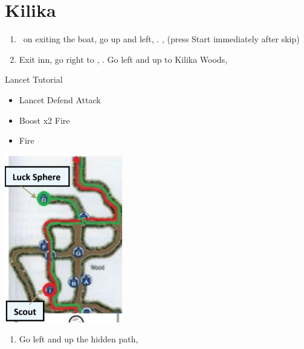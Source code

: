 \chapter{Kilika}

\begin{enumerate}
    \item \sd\ on exiting the boat, go up and left, \sd. \skippablefmv[2:00], (press Start immediately after skip) \sd
    \item Exit inn, go right to \wakka, \sd. Go left and up to Kilika Woods, \sd
\end{enumerate}
\begin{battle}{Lancet Tutorial}
    \begin{itemize}
        \item \sd
        \kimahrif Lancet
        \switch{\kimahri}{\wakka}
        \wakkaf Defend
		\tidusf Attack
		\item {}
			\begin{itemize}
				\switch{\lulu}{\yuna}
				\summon{\valefor}
				\valeforf Boost x2
				\valeforf Fire
			\end{itemize}
		\item \texit{Else:}
			\begin{itemize}
        		\luluf Fire
			\end{itemize}        
    \end{itemize}
\end{battle}
\includegraphics{graphics/kilikamap}
\begin{enumerate}[resume]
    \item Go left and up the hidden path, 
\end{enumerate}
